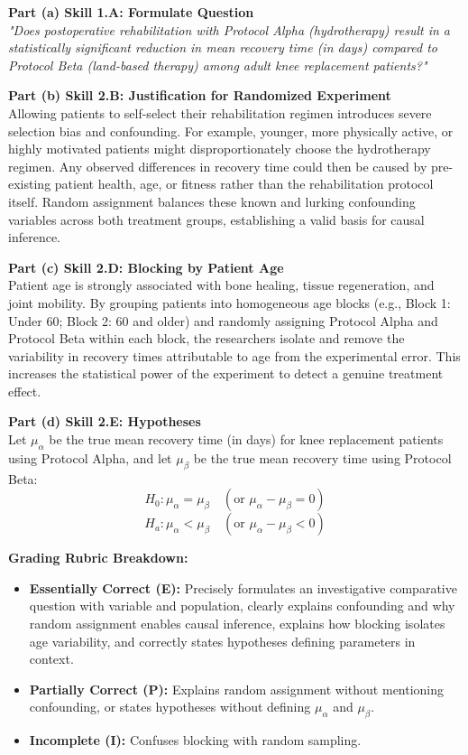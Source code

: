 \begin{frqrubricbox}
\textbf{Part (a) Skill 1.A: Formulate Question}\\
\textit{"Does postoperative rehabilitation with Protocol Alpha (hydrotherapy) result in a statistically significant reduction in mean recovery time (in days) compared to Protocol Beta (land-based therapy) among adult knee replacement patients?"}

\textbf{Part (b) Skill 2.B: Justification for Randomized Experiment}\\
Allowing patients to self-select their rehabilitation regimen introduces severe selection bias and confounding. For example, younger, more physically active, or highly motivated patients might disproportionately choose the hydrotherapy regimen. Any observed differences in recovery time could then be caused by pre-existing patient health, age, or fitness rather than the rehabilitation protocol itself. Random assignment balances these known and lurking confounding variables across both treatment groups, establishing a valid basis for causal inference.

\textbf{Part (c) Skill 2.D: Blocking by Patient Age}\\
Patient age is strongly associated with bone healing, tissue regeneration, and joint mobility. By grouping patients into homogeneous age blocks (e.g., Block 1: Under 60; Block 2: 60 and older) and randomly assigning Protocol Alpha and Protocol Beta within each block, the researchers isolate and remove the variability in recovery times attributable to age from the experimental error. This increases the statistical power of the experiment to detect a genuine treatment effect.

\textbf{Part (d) Skill 2.E: Hypotheses}\\
Let $\mu_\alpha$ be the true mean recovery time (in days) for knee replacement patients using Protocol Alpha, and let $\mu_\beta$ be the true mean recovery time using Protocol Beta:
\[ H_0: \mu_\alpha = \mu_\beta \quad (\text{or } \mu_\alpha - \mu_\beta = 0) \]
\[ H_a: \mu_\alpha < \mu_\beta \quad (\text{or } \mu_\alpha - \mu_\beta < 0) \]

\textbf{Grading Rubric Breakdown:}\\
\begin{itemize}
  \item \textbf{Essentially Correct (E):} Precisely formulates an investigative comparative question with variable and population, clearly explains confounding and why random assignment enables causal inference, explains how blocking isolates age variability, and correctly states hypotheses defining parameters in context.
  \item \textbf{Partially Correct (P):} Explains random assignment without mentioning confounding, or states hypotheses without defining $\mu_\alpha$ and $\mu_\beta$.
  \item \textbf{Incomplete (I):} Confuses blocking with random sampling.
\end{itemize}
\end{frqrubricbox}

